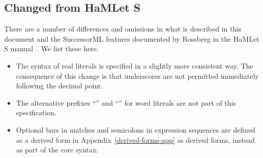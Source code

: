 \subsection{Changed from HaMLet S}
There are a number of differences and omissions in what is described in this document
and the SuccessorML features documented by Rossberg in the HaMLet S manual~\cite{hamlet-s}.
We list these here.
\begin{itemize}
  \item
    The syntax of real literals is specified in a slightly more consistent way.  The consequence of this
    change is that underscores are not permitted immediately following the decimal point.
  \item
    The alternative prefixes ``'' and ``'' for word literals are not part of
    this specification.
  \item
    Optional bars in matches and semicolons in expression sequences are defined as a derived form
    in Appendix~\ref{derived-forms-app} as derived forms, instead as part of the core syntax.
\end{itemize}%
